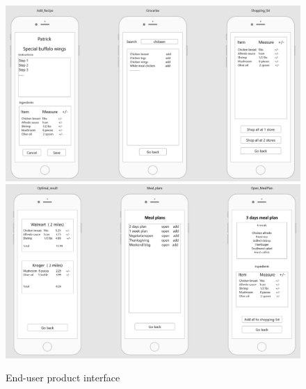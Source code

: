 \begin{figure}[H]
	\centering
   	\includegraphics[width=1\textwidth]{images/I3.PNG}
   	\includegraphics[width=1\textwidth]{images/I4.PNG}
   	\caption{End-user product interface}
\end{figure}  
    
    
    
    
    
    
   
   	
   	
    

